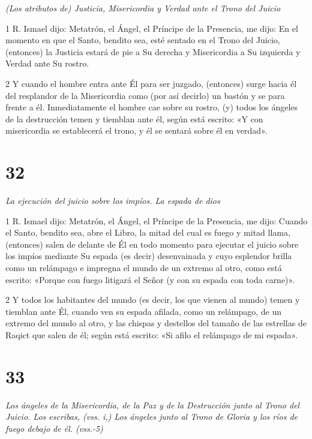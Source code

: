 \par \textit{(Los atributos de) Justicia, Misericordia y Verdad ante el Trono del Juicio}

\par 1 R. Ismael dijo: Metatrón, el Ángel, el Príncipe de la Presencia, me dijo: En el momento en que el Santo, bendito sea, esté sentado en el Trono del Juicio, (entonces) la Justicia estará de pie a Su derecha y Misericordia a Su izquierda y Verdad ante Su rostro.

\par 2 Y cuando el hombre entra ante Él para ser juzgado, (entonces) surge hacia él del resplandor de la Misericordia como (por así decirlo) un bastón y se para frente a él. Inmediatamente el hombre cae sobre su rostro, (y) todos los ángeles de la destrucción temen y tiemblan ante él, según está escrito: «Y con misericordia se establecerá el trono, y él se sentará sobre él en verdad».

\chapter{32}

\par \textit{La ejecución del juicio sobre los impíos. La espada de dios}

\par 1 R. Ismael dijo: Metatrón, el Ángel, el Príncipe de la Presencia, me dijo: Cuando el Santo, bendito sea, abre el Libro, la mitad del cual es fuego y mitad llama, (entonces) salen de delante de Él en todo momento para ejecutar el juicio sobre los impíos mediante Su espada (es decir) desenvainada y cuyo esplendor brilla como un relámpago e impregna el mundo de un extremo al otro, como está escrito: «Porque con fuego litigará el Señor (y con su espada con toda carne)».

\par 2 Y todos los habitantes del mundo (es decir, los que vienen al mundo) temen y tiemblan ante Él, cuando ven su espada afilada, como un relámpago, de un extremo del mundo al otro, y las chispas y destellos del tamaño de las estrellas de Raqict que salen de él; según está escrito: «Si afilo el relámpago de mi espada».


\chapter{33}

\par \textit{Los ángeles de la Misericordia, de la Paz y de la Destrucción junto al Trono del Juicio. Los escribas, (vss. i,) Los ángeles junto al Trono de Gloria y los ríos de fuego debajo de él. (vss.-5)}

